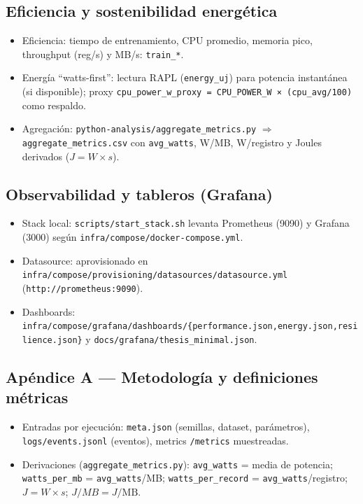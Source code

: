 \subsection*{Eficiencia y sostenibilidad energética}
\begin{itemize}
  \item Eficiencia: tiempo de entrenamiento, CPU promedio, memoria pico, throughput (reg/s) y MB/s: \verb|train_*|.
  \item Energía ``watts-first'': lectura RAPL (\verb|energy_uj|) para potencia instantánea (si disponible); proxy \verb|cpu_power_w_proxy = CPU_POWER_W × (cpu_avg/100)| como respaldo.
  \item Agregación: \verb|python-analysis/aggregate_metrics.py| $\Rightarrow$ \verb|aggregate_metrics.csv| con \verb|avg_watts|, W/MB, W/registro y Joules derivados ($J = W\times s$).
\end{itemize}

\subsection*{Observabilidad y tableros (Grafana)}
\begin{itemize}
  \item Stack local: \verb|scripts/start_stack.sh| levanta Prometheus (9090) y Grafana (3000) según \verb|infra/compose/docker-compose.yml|.
  \item Datasource: aprovisionado en \verb|infra/compose/provisioning/datasources/datasource.yml| (\verb|http://prometheus:9090|).
  \item Dashboards: \verb|infra/compose/grafana/dashboards/{performance.json,energy.json,resilience.json}| y \verb|docs/grafana/thesis_minimal.json|.
\end{itemize}

\subsection*{Apéndice A — Metodología y definiciones métricas}
\begin{itemize}
  \item Entradas por ejecución: \verb|meta.json| (semillas, dataset, parámetros), \verb|logs/events.jsonl| (eventos), metrics \verb|/metrics| muestreadas.
  \item Derivaciones (\verb|aggregate_metrics.py|): \verb|avg_watts| = media de potencia; \verb|watts_per_mb| = \verb|avg_watts|/MB; \verb|watts_per_record| = \verb|avg_watts|/registro; $J = W\times s$; $J/MB = J/\text{MB}$.
\end{itemize}


